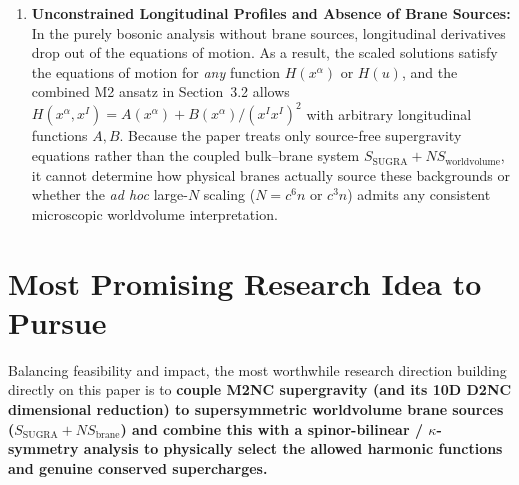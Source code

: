 \documentclass[11pt]{article}
\begin{document}
\begin{enumerate}
    \item \textbf{Unconstrained Longitudinal Profiles and Absence of Brane Sources:} In the purely bosonic analysis without brane sources, longitudinal derivatives drop out of the equations of motion. As a result, the scaled solutions satisfy the equations of motion for \emph{any} function $H(x^\alpha)$ or $H(u)$, and the combined M2 ansatz in Section~3.2 allows $H(x^\alpha, x^I) = A(x^\alpha) + B(x^\alpha)/(x^I x^I)^2$ with arbitrary longitudinal functions $A, B$. Because the paper treats only source-free supergravity equations rather than the coupled bulk--brane system $S_{\text{SUGRA}} + N S_{\text{worldvolume}}$, it cannot determine how physical branes actually source these backgrounds or whether the \emph{ad hoc} large-$N$ scaling ($N = c^6 n$ or $c^3 n$) admits any consistent microscopic worldvolume interpretation.
\end{enumerate}

\section{Most Promising Research Idea to Pursue}
Balancing feasibility and impact, the most worthwhile research direction building directly on this paper is to \textbf{couple M2NC supergravity (and its 10D D2NC dimensional reduction) to supersymmetric worldvolume brane sources ($S_{\text{SUGRA}} + N S_{\text{brane}}$) and combine this with a spinor-bilinear / $\kappa$-symmetry analysis to physically select the allowed harmonic functions and genuine conserved supercharges.}
\end{document}
